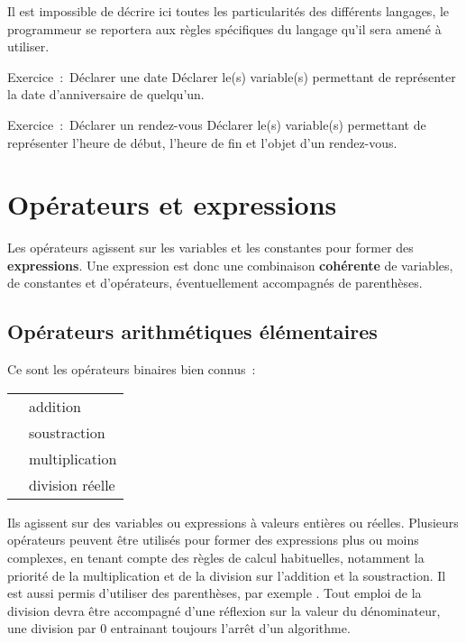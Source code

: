 			Il est impossible de décrire ici toutes les particularités des
			différents langages, le programmeur se reportera aux règles spécifiques
			du langage qu’il sera amené à utiliser.

			
			\begin{Emphase}[exercice]{Exercice~:~Déclarer une date}
				Déclarer le(s) variable(s) permettant de représenter la date
				d’anniversaire de quelqu’un.
			\end{Emphase}
			
			
			\begin{Emphase}[exercice]{Exercice~:~Déclarer un rendez-vous}
				Déclarer le(s) variable(s) permettant de représenter
				l’heure de début, l’heure de fin et
				l’objet d’un rendez-vous.
			\end{Emphase}

	\section{Opérateurs et expressions}
	
		Les opérateurs agissent sur les variables et les constantes pour former
		des \textbf{expressions}. Une expression est donc une combinaison
		\textbf{cohérente} de variables, de constantes et d’opérateurs,
		éventuellement accompagnés de parenthèses.
	
		\subsection{Opérateurs arithmétiques élémentaires}
	
			Ce sont les opérateurs binaires bien connus~:
	
			\begin{center}
			\tablehead{}
			\begin{supertabular}{m{1cm}|m{12cm}}
			\raggedleft  \textstyleCodeInsr{+} & addition\\
			\raggedleft  \textstyleCodeInsr{-} & soustraction\\
			\raggedleft  \textstyleCodeInsr{*} & multiplication\\
			\raggedleft  \textstyleCodeInsr{/} & division réelle\\
			\end{supertabular}
			\end{center}
	
			Ils agissent sur des variables ou expressions à valeurs entières ou
			réelles. Plusieurs opérateurs peuvent être utilisés pour former des
			expressions plus ou moins complexes, en tenant compte des règles de
			calcul habituelles, notamment la priorité de la multiplication et de la
			division sur l’addition et la soustraction. Il est aussi permis
			d’utiliser des parenthèses, par exemple . Tout emploi de la division devra être accompagné d’une réflexion
			sur la valeur du dénominateur, une division par 0 entrainant toujours
			l’arrêt d’un algorithme.
	
